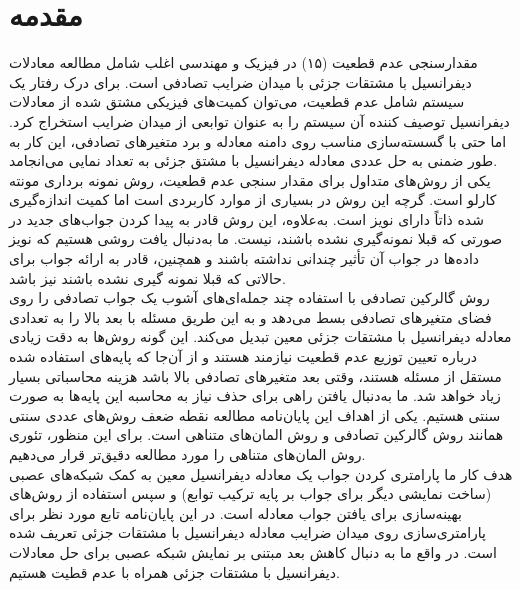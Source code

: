 \section*{مقدمه}
مقدارسنجی عدم قطعیت (۱۵) در فیزیک و مهندسی اغلب شامل مطالعه معادلات دیفرانسیل با مشتقات جزئی با میدان ضرایب تصادفی است. برای درک رفتار یک سیستم شامل عدم قطعیت، می‌توان کمیت‌های فیزیکی مشتق شده از معادلات دیفرانسیل توصیف کننده آن سیستم را به عنوان توابعی از میدان ضرایب استخراج کرد. اما حتی با گسسته‌سازی مناسب روی دامنه معادله و برد متغیرهای تصادفی، این کار به طور ضمنی به حل عددی معادله دیفرانسیل با مشتق جزئی به تعداد نمایی می‌انجامد.\\
یکی از روش‌های متداول برای مقدار سنجی عدم قطعیت، روش نمونه‌ برداری مونته کارلو است. گرچه این روش در بسیاری از موارد کاربردی است اما کمیت اندازه‌گیری شده ذاتاً دارای نویز است. به‌علاوه، این روش قادر به پیدا کردن جواب‌های جدید در صورتی که قبلا نمونه‌گیری نشده باشند، نیست. ما به‌دنبال یافت روشی هستیم که نویز داده‌ها در جواب آن تأثیر چندانی نداشته باشند و همچنین، قادر به ارائه جواب برای حالاتی که قبلا نمونه گیری نشده باشند نیز باشد. \\
روش گالرکین تصادفی با استفاده چند جمله‌ای‌های آشوب  یک جواب تصادفی را روی فضای متغیرهای تصادفی بسط می‌دهد و به این طریق مسئله با بعد بالا را به تعدادی معادله دیفرانسیل با مشتقات جزئی معین تبدیل می‌کند. این گونه روش‌ها به دقت زیادی درباره تعیین توزیع عدم قطعیت نیازمند هستند و از آن‌جا که پایه‌های استفاده شده مستقل از مسئله هستند، وقتی بعد متغیرهای تصادفی بالا باشد هزینه محاسباتی بسیار زیاد خواهد شد. ما به‌دنبال یافتن راهی برای حذف نیاز به محاسبه این پایه‌ها به صورت سنتی هستیم. یکی از اهداف این پایان‌نامه مطالعه نقطه ضعف روش‌های عددی سنتی همانند روش گالرکین تصادفی و روش المان‌های متناهی است. برای این منظور، تئوری روش المان‌های متناهی را مورد مطالعه دقیق‌تر قرار می‌دهیم.\\
هدف کار ما پارامتری کردن جواب یک معادله دیفرانسیل معین به کمک شبکه‌های عصبی (ساخت نمایشی دیگر برای جواب بر پایه ترکیب توابع) و سپس استفاده از روش‌های بهینه‌سازی برای یافتن جواب معادله است. در این پایان‌نامه تابع مورد نظر برای پارامتری‌سازی روی میدان ضرایب معادله دیفرانسیل با مشتقات جزئی تعریف شده است. در واقع ما به دنبال کاهش بعد مبتنی بر نمایش شبکه ‌عصبی برای حل معادلات دیفرانسیل با مشتقات جزئی همراه با عدم قطیت هستیم.
